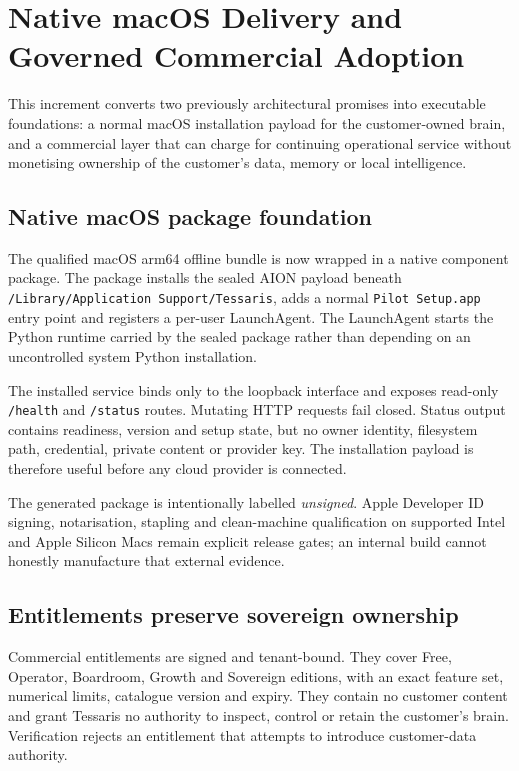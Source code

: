 \section{Native macOS Delivery and Governed Commercial Adoption}

This increment converts two previously architectural promises into executable foundations: a
normal macOS installation payload for the customer-owned brain, and a commercial layer that can
charge for continuing operational service without monetising ownership of the customer's data,
memory or local intelligence.

\subsection{Native macOS package foundation}

The qualified macOS arm64 offline bundle is now wrapped in a native component package.  The
package installs the sealed AION payload beneath \texttt{/Library/Application Support/Tessaris},
adds a normal \texttt{Pilot Setup.app} entry point and registers a per-user LaunchAgent.  The
LaunchAgent starts the Python runtime carried by the sealed package rather than depending on an
uncontrolled system Python installation.

The installed service binds only to the loopback interface and exposes read-only
\texttt{/health} and \texttt{/status} routes.  Mutating HTTP requests fail closed.  Status output
contains readiness, version and setup state, but no owner identity, filesystem path, credential,
private content or provider key.  The installation payload is therefore useful before any cloud
provider is connected.

The generated package is intentionally labelled \emph{unsigned}.  Apple Developer ID signing,
notarisation, stapling and clean-machine qualification on supported Intel and Apple Silicon Macs
remain explicit release gates; an internal build cannot honestly manufacture that external
evidence.

\subsection{Entitlements preserve sovereign ownership}

Commercial entitlements are signed and tenant-bound.  They cover Free, Operator, Boardroom,
Growth and Sovereign editions, with an exact feature set, numerical limits, catalogue version and
expiry.  They contain no customer content and grant Tessaris no authority to inspect, control or
retain the customer's brain.  Verification rejects an entitlement that attempts to introduce
customer-data authority.

